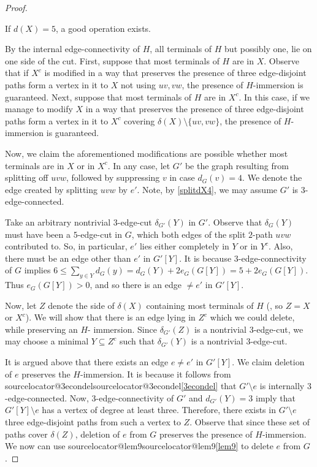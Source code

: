 \documentclass[10pt,a4paper]{amsart}
\makeatletter
\let\originalcref\cref
\renewcommand{\cref}[1]{\ifcsname sourcelocator@#1\endcsname\csname sourcelocator@#1\endcsname\else\originalcref{#1}\fi}
\makeatother
\begin{document}
\begin{proof}
\begin{claim}
If $d(X)=5$, a good operation exists.
\end{claim}
By the internal edge-connectivity of $H$, all terminals of $H$ but possibly one, lie on one side of the cut. First, suppose that most terminals of $H$ are in $X$. Observe that if $X^c$ is modified in a way that preserves the presence of three edge-disjoint paths form a vertex in it to $X$ not using $uv, vw$, the presence of $H$-immersion is guaranteed. Next, suppose that most terminals of $H$ are in $X^c$. In this case, if we manage to modify $X$ in a way that preserves the presence of three edge-disjoint paths form a vertex in it to $X^c$ covering $\delta(X)\setminus \{uv,vw\}$, the presence of $H$-immersion is guaranteed. 

Now, we claim the aforementioned modifications are possible whether most terminals are in $X$ or in $X^c$. In any case, let $G'$ be the graph resulting from splitting off $uvw$, followed by suppressing $v$ in case $d_{G}(v)=4$. We denote the edge created by splitting $uvw$ by $e'$. Note, by \ref{splitdX4}, we may assume $G'$ is 3-edge-connected.

Take an arbitrary nontrivial $3$-edge-cut $\delta_{G'}(Y)$ in $G'$. Observe that $\delta_G(Y)$ must have been a $5$-edge-cut in $G$, which both edges of the split $2$-path $uvw$ contributed to. So, in particular, $e'$ lies either completely in $Y$ or in $Y^c$. Also, there must be an edge other than $e'$ in $G'[Y]$. It is because $3$-edge-connectivity of $G$ implies $6\le \sum_{y \in Y} d_G(y)=d_G(Y)+2 e_G(G[Y])=5+2 e_G(G[Y])$. Thus $e_G(G[Y])>0$, and so there is an edge $\neq e'$ in $G'[Y]$.

Now, let $Z$ denote the side of $\delta(X)$ containing most terminals of $H$ (, so $Z=X$ or $X^c$). We will show that there is an edge lying in $Z^c$ which we could delete, while preserving an $H$- immersion. Since $\delta_{G'}(Z)$ is a nontrivial $3$-edge-cut, we may choose a minimal $Y\subseteq Z^c$ such that $\delta_{G'}(Y)$ is a nontrivial $3$-edge-cut.

It is argued above that there exists an edge $e\neq e'$ in $G'[Y]$. We claim deletion of $e$ preserves the $H$-immersion. It is because it follows from \cref{3econdel} that $G'\setminus e$ is internally $3$-edge-connected. Now, $3$-edge-connectivity of $G'$ and $d_{G'}(Y)=3$ imply that $G'[Y]\setminus e$ has a vertex of degree at least three. Therefore, there exists in $G'\setminus e$ three edge-disjoint paths from such a vertex to $Z$. Observe that since these set of paths cover $\delta(Z)$, deletion of $e$ from $G$ preserves the presence of $H$-immersion. We now can use \cref{lem9} to delete $e$ from $G$.
\end{proof}
\end{document}
